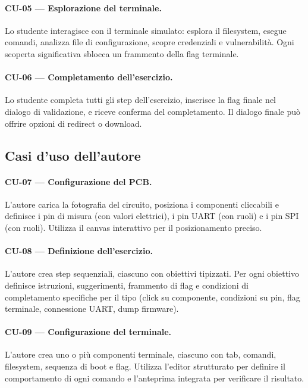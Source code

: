 \paragraph{CU-05 --- Esplorazione del terminale.} Lo studente interagisce con il terminale simulato: esplora il filesystem, esegue comandi, analizza file di configurazione, scopre credenziali e vulnerabilità. Ogni scoperta significativa sblocca un frammento della flag terminale.

\paragraph{CU-06 --- Completamento dell'esercizio.} Lo studente completa tutti gli step dell'esercizio, inserisce la flag finale nel dialogo di validazione, e riceve conferma del completamento. Il dialogo finale può offrire opzioni di redirect o download.

\subsection{Casi d'uso dell'autore}
\label{subsec:cu-autore}

\paragraph{CU-07 --- Configurazione del PCB.} L'autore carica la fotografia del circuito, posiziona i componenti cliccabili e definisce i pin di misura (con valori elettrici), i pin UART (con ruoli) e i pin SPI (con ruoli). Utilizza il canvas interattivo per il posizionamento preciso.

\paragraph{CU-08 --- Definizione dell'esercizio.} L'autore crea step sequenziali, ciascuno con obiettivi tipizzati. Per ogni obiettivo definisce istruzioni, suggerimenti, frammento di flag e condizioni di completamento specifiche per il tipo (click su componente, condizioni su pin, flag terminale, connessione UART, dump firmware).

\paragraph{CU-09 --- Configurazione del terminale.} L'autore crea uno o più componenti terminale, ciascuno con tab, comandi, filesystem, sequenza di boot e flag. Utilizza l'editor strutturato per definire il comportamento di ogni comando e l'anteprima integrata per verificare il risultato.


